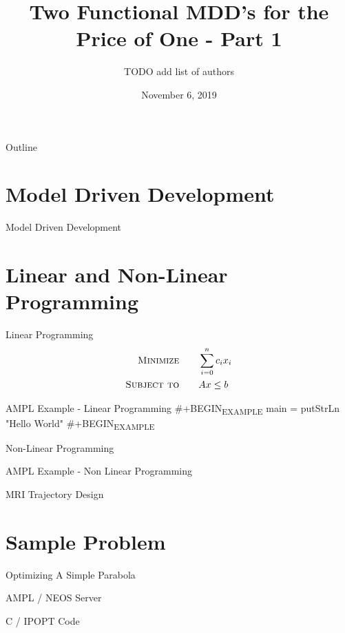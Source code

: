 \documentclass[presentation]{beamer}
\author{TODO add list of authors}
\date{November 6, 2019}
\title{Two Functional MDD's for the Price of One - Part 1}
\begin{document}
\maketitle
\begin{frame}{Outline}
\tableofcontents
\end{frame}


\section{Model Driven Development}
\label{sec:orgfb7ded4}
\begin{frame}[label={sec:org18ccdca}]{Model Driven Development}
\end{frame}
\section{Linear and Non-Linear Programming}
\label{sec:orgc54e401}
\begin{frame}[label={sec:org45370e2}]{Linear Programming}
\begin{align}
\textsc{Minimize} \qquad & \sum_{i=0}^{n} c_i x_i \\
\textsc{Subject to} \qquad &  Ax \leq b 
\end{align}
\end{frame}
\begin{frame}[label={sec:orgaf0f1c1}]{AMPL Example - Linear Programming}
\#+BEGIN\textsubscript{EXAMPLE}
main = putStrLn "Hello World"
\#+BEGIN\textsubscript{EXAMPLE}
\end{frame}
\begin{frame}[label={sec:orgd75cf53}]{Non-Linear Programming}
\end{frame}
\begin{frame}[label={sec:org4ae74ea}]{AMPL Example - Non Linear Programming}
\end{frame}
\begin{frame}[label={sec:org1bb8844}]{MRI Trajectory Design}
\end{frame}
\section{Sample Problem}
\label{sec:org98b6cca}
\begin{frame}[label={sec:orgb082198}]{Optimizing A Simple Parabola}
\end{frame}
\begin{frame}[label={sec:org999048f}]{AMPL / NEOS Server}
\end{frame}
\begin{frame}[label={sec:orga34f6b7}]{C / IPOPT Code}
\end{frame}
\end{document}
